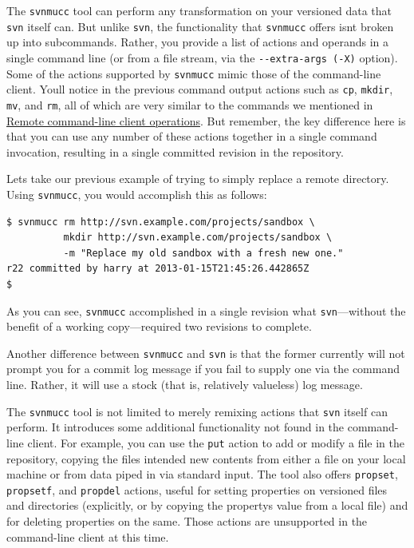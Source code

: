 The \texttt{svnmucc} tool can perform any transformation on your
versioned data that \texttt{svn} itself can. But unlike \texttt{svn},
the functionality that \texttt{svnmucc} offers isn\textquotesingle t
broken up into subcommands. Rather, you provide a list of actions and
operands in a single command line (or from a file stream, via the
\texttt{-\/-extra-args\ (-X)} option). Some of the actions supported by
\texttt{svnmucc} mimic those of the command-line client.
You\textquotesingle ll notice in the previous command output actions
such as \texttt{cp}, \texttt{mkdir}, \texttt{mv}, and \texttt{rm}, all
of which are very similar to the commands we mentioned in
\hyperref[svn.advanced.working-without-a-wc.svn]{Remote command-line
client operations}. But remember, the key difference here is that you
can use any number of these actions together in a single command
invocation, resulting in a single committed revision in the repository.

Let\textquotesingle s take our previous example of trying to simply
replace a remote directory. Using \texttt{svnmucc}, you would accomplish
this as follows:

\begin{verbatim}
$ svnmucc rm http://svn.example.com/projects/sandbox \
          mkdir http://svn.example.com/projects/sandbox \
          -m "Replace my old sandbox with a fresh new one."
r22 committed by harry at 2013-01-15T21:45:26.442865Z
$ 
\end{verbatim}

As you can see, \texttt{svnmucc} accomplished in a single revision what
\texttt{svn}---without the benefit of a working copy---required two
revisions to complete.

Another difference between \texttt{svnmucc} and \texttt{svn} is that the
former currently will not prompt you for a commit log message if you
fail to supply one via the command line. Rather, it will use a stock
(that is, relatively valueless) log message.

The \texttt{svnmucc} tool is not limited to merely remixing actions that
\texttt{svn} itself can perform. It introduces some additional
functionality not found in the command-line client. For example, you can
use the \texttt{put} action to add or modify a file in the repository,
copying the file\textquotesingle s intended new contents from either a
file on your local machine or from data piped in via standard input. The
tool also offers \texttt{propset}, \texttt{propsetf}, and
\texttt{propdel} actions, useful for setting properties on versioned
files and directories (explicitly, or by copying the
property\textquotesingle s value from a local file) and for deleting
properties on the same. Those actions are unsupported in the
command-line client at this time.

